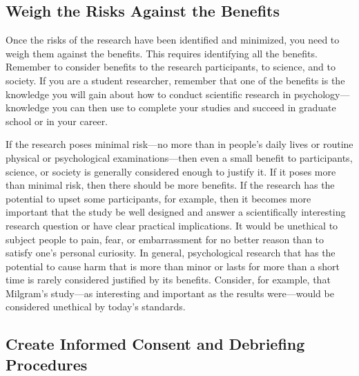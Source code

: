 \documentclass[
]{krantz}
\begin{document}
\hypertarget{weigh-the-risks-against-the-benefits}{%
\subsection*{Weigh the Risks Against the Benefits}\label{weigh-the-risks-against-the-benefits}}


Once the risks of the research have been identified and minimized, you need to weigh them against the benefits. This requires identifying all the benefits. Remember to consider benefits to the research participants, to science, and to society. If you are a student researcher, remember that one of the benefits is the knowledge you will gain about how to conduct scientific research in psychology---knowledge you can then use to complete your studies and succeed in graduate school or in your career.

If the research poses minimal risk---no more than in people's daily lives or routine physical or psychological examinations---then even a small benefit to participants, science, or society is generally considered enough to justify it. If it poses more than minimal risk, then there should be more benefits. If the research has the potential to upset some participants, for example, then it becomes more important that the study be well designed and answer a scientifically interesting research question or have clear practical implications. It would be unethical to subject people to pain, fear, or embarrassment for no better reason than to satisfy one's personal curiosity. In general, psychological research that has the potential to cause harm that is more than minor or lasts for more than a short time is rarely considered justified by its benefits. Consider, for example, that Milgram's study---as interesting and important as the results were---would be considered unethical by today's standards.

\hypertarget{create-informed-consent-and-debriefing-procedures}{%
\subsection*{Create Informed Consent and Debriefing Procedures}\label{create-informed-consent-and-debriefing-procedures}}
\end{document}
